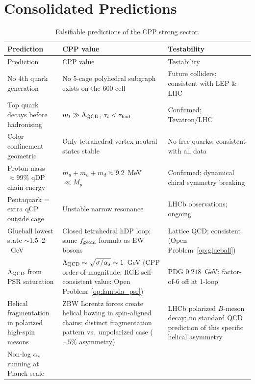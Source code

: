 \documentclass[11pt,letterpaper]{article}
\newcommand{\as}{\alpha_s}
\begin{document}
\section{Consolidated Predictions}
\label{sec:predictions}

\begin{longtable}{@{}p{5.2cm}p{4cm}p{3.5cm}@{}}
\caption{Falsifiable predictions of the CPP strong sector.}
\label{tab:predictions}\\
\toprule
Prediction & CPP value & Testability \\
\midrule
\endfirsthead
\toprule
Prediction & CPP value & Testability \\
\midrule
\endhead
\bottomrule
\endfoot
No 4th quark generation
  & No 5-cage polyhedral subgraph exists on the 600-cell
  & Future colliders; consistent with LEP \& LHC \\[4pt]
Top quark decays before hadronising
  & $m_t \gg \Lambda_{\rm QCD}$, $\tau_t < \tau_{\rm had}$
  & Confirmed; Tevatron/LHC \\[4pt]
Color confinement geometric
  & Only tetrahedral-vertex-neutral states stable
  & No free quarks; consistent with all data \\[4pt]
Proton mass $\approx99\%$ qDP chain energy
  & $m_u{+}m_u{+}m_d \approx 9.2$~MeV~$\ll M_p$
  & Confirmed; dynamical chiral symmetry breaking \\[4pt]
Pentaquark = extra qCP outside cage
  & Unstable narrow resonance
  & LHCb observations; ongoing \\[4pt]
Glueball lowest state $\sim1.5$--$2$~GeV
  & Closed tetrahedral hDP loop; same $f_{\rm geom}$ formula as EW bosons
  & Lattice QCD; consistent (Open Problem~\ref{op:glueball}) \\[4pt]
$\Lambda_{\rm QCD}$ from PSR saturation
  & $\Lambda_{\rm QCD} \sim \sqrt{\sigma/\alpha_s} \sim 1$~GeV
  (CPP order-of-magnitude; RGE self-consistent value: Open
  Problem~\ref{op:lambda_psr})
  & PDG $0.218$~GeV; factor-of-6 off at 1-loop \\[4pt]
Helical fragmentation in polarized high-spin mesons
  & ZBW Lorentz forces create helical bowing in spin-aligned chains;
  distinct fragmentation pattern vs.\ unpolarized case
  ($\sim 5\%$ asymmetry)
  & LHCb polarized $B$-meson decay; no standard QCD prediction of
  this specific helical asymmetry \\[4pt]
Non-log $\as$ running at Planck scale

\end{longtable}
\end{document}
